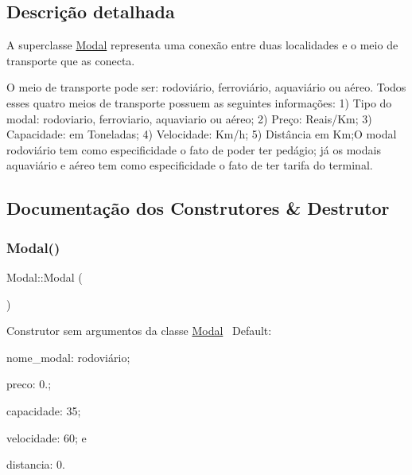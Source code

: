 \subsection{Descrição detalhada}
A superclasse \hyperlink{classModal}{Modal} representa uma conexão entre duas localidades e o meio de transporte que as conecta. 

O meio de transporte pode ser\+: rodoviário, ferroviário, aquaviário ou aéreo. Todos esses quatro meios de transporte possuem as seguintes informações\+: 1) Tipo do modal\+: rodoviario, ferroviario, aquaviario ou aéreo; 2) Preço\+: Reais/\+Km; 3) Capacidade\+: em Toneladas; 4) Velocidade\+: Km/h; 5) Distância em Km;O modal rodoviário tem como especificidade o fato de poder ter pedágio; já os modais aquaviário e aéreo tem como especificidade o fato de ter tarifa do terminal. 

\subsection{Documentação dos Construtores \& Destrutor}
\mbox{\label{classModal_a8762a8d9f09cb6a2ec5f54f5d26412c0}} 
\subsubsection{\texorpdfstring{Modal()}{Modal()}\hspace{0.1cm}{\footnotesize\ttfamily [1/2]}}
{\footnotesize\ttfamily Modal\+::\+Modal (\begin{DoxyParamCaption}{ }\end{DoxyParamCaption})}

Construtor sem argumentos da classe \hyperlink{classModal}{Modal}~\newline
Default\+:
\begin{DoxyItemize}
\item nome\+\_\+modal\+: rodoviário;
\item preco\+: 0.;
\item capacidade\+: 35;
\item velocidade\+: 60; e
\item distancia\+: 0.~\newline

\end{DoxyItemize}\mbox{\label{classModal_a17560766811007d0af99fd6099325d52}} 
